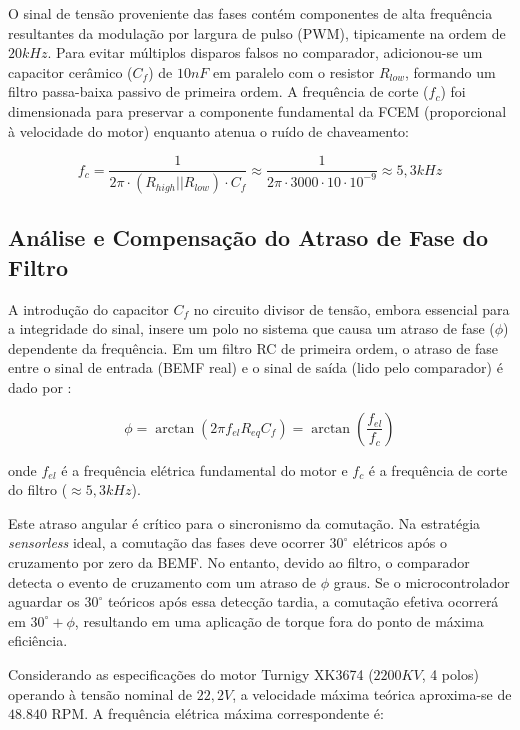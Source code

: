 \documentclass[12pt, a4paper, openright, oneside, brazilian]{abntex2}
\begin{document}
O sinal de tensão proveniente das fases contém componentes de alta frequência resultantes da modulação por largura de pulso (PWM), tipicamente na ordem de $20kHz$. Para evitar múltiplos disparos falsos no comparador, adicionou-se um capacitor cerâmico ($C_f$) de $10nF$ em paralelo com o resistor $R_{low}$, formando um filtro passa-baixa passivo de primeira ordem. A frequência de corte ($f_c$) foi dimensionada para preservar a componente fundamental da FCEM (proporcional à velocidade do motor) enquanto atenua o ruído de chaveamento:

\begin{equation}
    f_c = \frac{1}{2\pi \cdot (R_{high} || R_{low}) \cdot C_f} \approx \frac{1}{2\pi \cdot 3000 \cdot 10 \cdot 10^{-9}} \approx 5,3kHz
\end{equation}

\subsection{Análise e Compensação do Atraso de Fase do Filtro}

A introdução do capacitor $C_f$ no circuito divisor de tensão, embora essencial para a integridade do sinal, insere um polo no sistema que causa um atraso de fase ($\phi$) dependente da frequência. Em um filtro RC de primeira ordem, o atraso de fase entre o sinal de entrada (BEMF real) e o sinal de saída (lido pelo comparador) é dado por \cite{ti2013sensorless}:

\begin{equation}
    \phi = \arctan(2\pi f_{el} R_{eq} C_f) = \arctan\left(\frac{f_{el}}{f_c}\right)
    \label{eq:phase_lag}
\end{equation}

\noindent onde $f_{el}$ é a frequência elétrica fundamental do motor e $f_c$ é a frequência de corte do filtro ($\approx 5,3kHz$).

Este atraso angular é crítico para o sincronismo da comutação. Na estratégia \textit{sensorless} ideal, a comutação das fases deve ocorrer $30^{\circ}$ elétricos após o cruzamento por zero da BEMF. No entanto, devido ao filtro, o comparador detecta o evento de cruzamento com um atraso de $\phi$ graus. Se o microcontrolador aguardar os $30^{\circ}$ teóricos após essa detecção tardia, a comutação efetiva ocorrerá em $30^{\circ} + \phi$, resultando em uma aplicação de torque fora do ponto de máxima eficiência.

Considerando as especificações do motor Turnigy XK3674 ($2200KV$, 4 polos) operando à tensão nominal de $22,2V$, a velocidade máxima teórica aproxima-se de $48.840$ RPM. A frequência elétrica máxima correspondente é:
\end{document}
